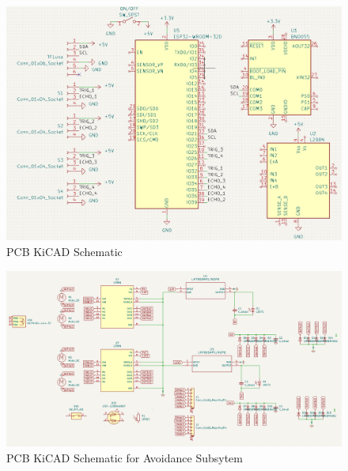 \begin{figure}[H]
	\centering
	\includegraphics[width=\textwidth]{./Images/PCB-sch.png}
	\caption{\label{fig:pcb-sch}PCB KiCAD Schematic}
\end{figure}

\begin{figure}[H]
	\centering
	\includegraphics[width=\textwidth]{./Images/pcb-avoidance-headers.png}
	\caption{\label{fig:pcb-motor}PCB KiCAD Schematic for Avoidance Subsytem}
\end{figure}